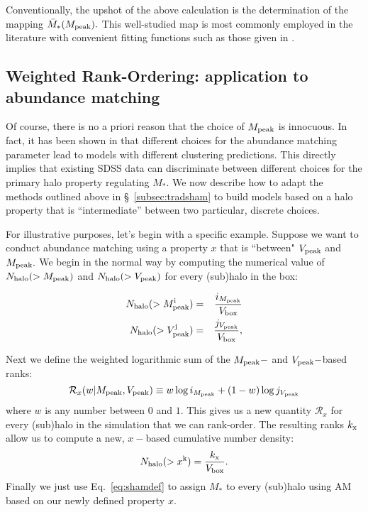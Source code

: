 \documentclass[usenatbib,usegraphicx,letterpaper]{mn2e}
\newcommand{\Nhalo}{N_{\rm halo}}
\newcommand{\mpeak}{M_{\rm peak}}
\newcommand{\vpeak}{V_{\rm peak}}
\newcommand{\beq}{\begin{equation}}
\newcommand{\eeq}{\end{equation}}
\newcommand{\mstar}{M_{\ast}}
\begin{document}
Conventionally, the upshot of the above calculation is the determination of the mapping $\bar{M}_{\ast}(\mpeak).$ This well-studied map is most commonly employed in the literature with convenient fitting functions such as those given in \citet{behroozi10,moster10,kravtsov13}. 

\subsection{Weighted Rank-Ordering: application to abundance matching}
\label{subsec:gensham}

Of course, there is no a priori reason that the choice of $\mpeak$ is innocuous. In fact, it has been shown in \citet{reddick12} that different choices for the abundance matching parameter lead to models with different clustering predictions. This directly implies that existing SDSS data can discriminate between different choices for the primary halo property regulating $\mstar.$ We now describe how to adapt the methods outlined above in \S~\ref{subsec:tradsham} to build models based on a halo property that is ``intermediate'' between two particular, discrete choices. 

For illustrative purposes, let's begin with a specific example. Suppose we want to conduct abundance matching using a property $x$ that is ``between" $\vpeak$ and $\mpeak.$ We begin in the normal way by computing the numerical value of $\Nhalo(>\mpeak)$ and $\Nhalo(>\vpeak)$ for every (sub)halo in the box:

\begin{eqnarray*}
\Nhalo(>\mpeak^{\rm i}) & = & \frac{i_{\mpeak}}{V_{\rm box}} \\
\Nhalo(>\vpeak^{\rm j}) & = & \frac{j_{\vpeak}}{V_{\rm box}},
\end{eqnarray*}

 Next we define the weighted logarithmic sum of the $\mpeak-$ and $\vpeak-$based ranks:
\begin{equation*}
\mathcal{R}_{x}(w | \mpeak,\vpeak) \equiv w\log i_{\mpeak} + (1-w)\log j_{\vpeak}
\end{equation*}
where $w$ is any number between $0$ and $1.$ This gives us a new quantity $\mathcal{R}_{x}$ for every (sub)halo in the simulation that we can rank-order. The resulting ranks $k_{\rm x}$ allow us to compute a new, $x-$based cumulative number density:
\beq
\Nhalo(>x^{\rm k})  =  \frac{k_{\rm x}}{V_{\rm box}}. 
\eeq
Finally we just use Eq.~\ref{eq:shamdef} to assign $\mstar$ to every (sub)halo using AM based on our newly defined property $x.$ 
\end{document}
